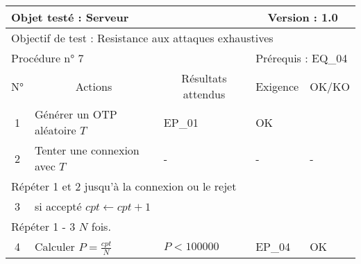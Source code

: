\documentclass{"../../res/univ-projet"}
\begin{document}
\begin{center}
    \begin{tabular}{|c|p{5cm}|p{5cm}|p{1.5cm}|p{1.5cm}|}
      \hline
      \multicolumn{3}{|l|}{Objet testé : Serveur} & \multicolumn{2}{c|}{Version : 1.0}\\ \hline
      \multicolumn{5}{|l|}{Objectif de test : Resistance aux attaques exhaustives}\\ \hline
      \multicolumn{3}{|l|}{Procédure n° 7} & \multicolumn{2}{p{3cm}|}{Prérequis : EQ\_04 }\\ \hline
      \multicolumn{1}{|c|}{N°} & \multicolumn{1}{c|}{Actions} & \multicolumn{1}{c|}{Résultats attendus} & 
      \multicolumn{1}{c|}{Exigence} & \multicolumn{1}{c|}{OK/KO}\\ \hline
      1 & Générer un OTP aléatoire $T$ & EP\_01 & OK \\
      2 & Tenter une connexion avec $T$ & - & - & - \\ \hline      
      \hline
      \multicolumn{5}{|l|}{Répéter 1 et 2 jusqu'à la connexion ou le rejet}\\
      \hline
      3 & si accepté $cpt \leftarrow cpt + 1$ & & & \\
      \hline
      \multicolumn{5}{|l|}{Répéter 1 - 3 $N$ fois.}\\
      \hline
      4 & Calculer $P = \frac{cpt}{N}$ & $P < 100000$ & EP\_04 & OK \\ \hline 
    \end{tabular}  
  \end{center}
  
\end{document}
